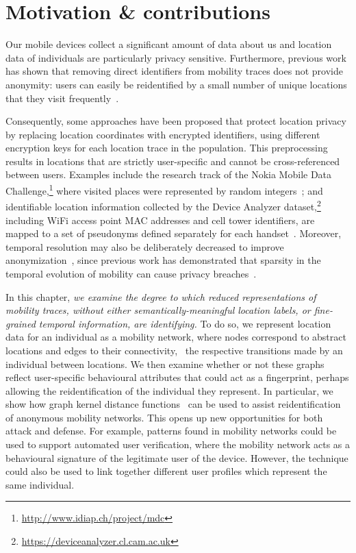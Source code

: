 \section{Motivation \& contributions}

Our mobile devices collect a significant amount of data about us and location data of individuals are particularly privacy sensitive.
Furthermore, previous work has shown that removing direct identifiers from mobility traces does not provide anonymity: users can easily be reidentified by a small number of unique locations that they visit frequently~\cite{DeMontjoye2013, Zang2011}.

Consequently, some approaches have been proposed that protect location privacy by replacing location coordinates with encrypted identifiers, using different encryption keys for each location trace in the population.
This preprocessing results in locations that are strictly user-specific and cannot be cross-referenced between users.
Examples include the research track of the Nokia Mobile Data Challenge,\footnote{\url{http://www.idiap.ch/project/mdc}} where visited places were represented by random integers~\cite{Laurila}; and identifiable location information collected by the Device Analyzer dataset,\footnote{\url{https://deviceanalyzer.cl.cam.ac.uk}} including WiFi access point MAC addresses and cell tower identifiers, are mapped to a set of pseudonyms defined separately for each handset~\cite{Wagner2014}.
Moreover, temporal resolution may also be deliberately decreased to improve anonymization~\cite{Gruteser}, since previous work has demonstrated that sparsity in the temporal evolution of mobility can cause privacy breaches~\cite{DeMontjoye2013}.

In this chapter, \emph{we examine the degree to which reduced representations of mobility traces, without either semantically-meaningful location labels, or fine-grained temporal information, are identifying.}
To do so, we represent location data for an individual as a mobility network, where nodes correspond to abstract locations and edges to their connectivity, \ie\ the respective transitions made by an individual between locations.
We then examine whether or not these graphs reflect user-specific behavioural attributes that could act as a fingerprint, perhaps allowing the reidentification of the individual they represent.
In particular, we show how graph kernel distance functions~\cite{Vishwanathan2010} can be used to assist reidentification of anonymous mobility networks.
This opens up new opportunities for both attack and defense.
For example, patterns found in mobility networks could be used to support automated user verification, where the mobility network acts as a behavioural signature of the legitimate user of the device.
However, the technique could also be used to link together different user profiles which represent the same individual.

